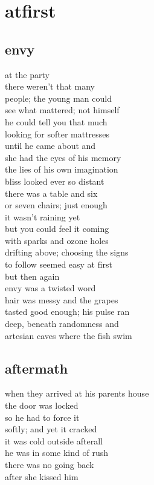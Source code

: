 \documentclass{article}
\begin{document}
\setlength{\parindent}{0.0cm}
\small

\section{atfirst}
\subsection{envy}

at the party\\
there weren't that many\\
people; the young man could\\
see what mattered; not himself\\
he could tell you that much\\
looking for softer mattresses\\
until he came about and\\
she had the eyes of his memory\\
the lies of his own imagination\\
bliss looked ever so distant\\

there was a table and six\\
or seven chairs; just enough\\
it wasn't raining yet\\
but you could feel it coming\\
with sparks and ozone holes\\
drifting above; choosing the signs\\
to follow seemed easy at first\\

but then again\\
envy was a twisted word\\
hair was messy and the grapes\\
tasted good enough; his pulse ran\\
deep, beneath randomness and\\
artesian caves where the fish swim\\
\clearpage


\subsection{aftermath}


when they arrived at his parents house\\
the door was locked\\
so he had to force it\\
softly; and yet it cracked\\
it was cold outside afterall\\
he was in some kind of rush\\
there was no going back\\
after she kissed him\\
\end{document}
